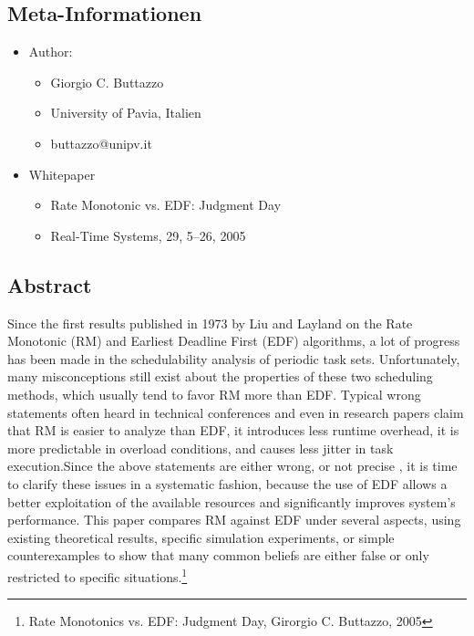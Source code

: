 \subsection{Meta-Informationen}
\begin{frame}{\subsecname}
	\begin{itemize}
		\item Author:
		\begin{itemize}
			\item Giorgio C. Buttazzo
			\item University of Pavia, Italien
			\item buttazzo@unipv.it
		\end{itemize}\pause
		\item Whitepaper
		\begin{itemize}
			\item Rate Monotonic vs. EDF: Judgment Day
			\item Real-Time Systems, 29, 5–26, 2005
		\end{itemize}						
		
	\end{itemize}
\end{frame} 

\subsection{Abstract}
\begin{frame}{\subsecname}
\tiny Since the first results published in 1973 by Liu and Layland on the Rate Monotonic (RM) and Earliest Deadline First (EDF) algorithms, a lot of progress has been made in the schedulability analysis of periodic task sets. Unfortunately, many misconceptions still exist about the properties of these two scheduling methods, which usually tend to favor RM more than EDF. Typical wrong statements often heard in technical conferences and even in research papers claim that RM is easier to analyze than EDF, it introduces less runtime overhead, it is more predictable in overload conditions, and causes less jitter in task execution.Since the above statements are either wrong, or not precise \tiny, it is time to clarify these issues in a systematic fashion, because the use of EDF allows a better exploitation of the available resources and significantly improves system’s performance. This paper compares RM against EDF under several aspects, using existing theoretical results, specific simulation experiments, or simple counterexamples to show that many common beliefs are either false or only restricted to specific situations.\footnote{Rate Monotonics vs. EDF: Judgment Day, Girorgio C. Buttazzo, 2005}
\end{frame}

